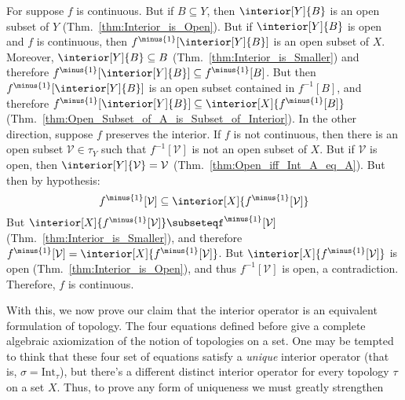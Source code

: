 \documentclass{article}                                                        %
\begin{document}
        \begin{bproof}
            For suppose $f$ is continuous. But if $B\subseteq{Y}$, then
            $\interior[Y]{B}$ is an open subset of $Y$
            (Thm.~\ref{thm:Interior_is_Open}). But if $\interior[Y]{B}$ is open
            and $f$ is continuous, then $f^{\minus{1}}[\interior[Y]{B}]$ is an
            open subset of $X$. Moreover, $\interior[Y]{B}\subseteq{B}$
            (Thm.~\ref{thm:Interior_is_Smaller}) and therefore
            $f^{\minus{1}}[\interior[Y]{B}]\subseteq{f}^{\minus{1}}[B]$. But
            then $f^{\minus{1}}[\interior[Y]{B}]$ is an open subset contained in
            $f^{\minus{1}}[B]$, and therefore
            $f^{\minus{1}}[\interior[Y]{B}]\subseteq%
             \interior[X]{f^{\minus{1}}[B]}$
            (Thm.~\ref{thm:Open_Subset_of_A_is_Subset_of_Interior}). In the
            other direction, suppose $f$ preserves the interior. If $f$ is not
            continuous, then there is an open subset $\mathcal{V}\in\tau_{Y}$
            such that $f^{\minus{1}}[\mathcal{V}]$ is not an open subset of $X$.
            But if $\mathcal{V}$ is open, then
            $\interior[Y]{\mathcal{V}}=\mathcal{V}$
            (Thm.~\ref{thm:Open_iff_Int_A_eq_A}). But then by hypothesis:
            \begin{equation}
                f^{\minus{1}}[\mathcal{V}]\subseteq
                \interior[X]{f^{\minus{1}}[\mathcal{V}]}
            \end{equation}
            But $\interior[X]{f^{\minus{1}}[\mathcal{V}]}\subseteq%
            f^{\minus{1}}[\mathcal{V}]$ (Thm.~\ref{thm:Interior_is_Smaller}),
            and therefore $f^{\minus{1}}[\mathcal{V}]=%
            \interior[X]{f^{\minus{1}}[\mathcal{V}]}$. But
            $\interior[X]{f^{\minus{1}}[\mathcal{V}]}$ is open
            (Thm.~\ref{thm:Interior_is_Open}), and thus
            $f^{\minus{1}}[\mathcal{V}]$ is open, a contradiction. Therefore,
            $f$ is continuous.
        \end{bproof}
        With this, we now prove our claim that the interior operator is an
        equivalent formulation of topology. The four equations defined before
        give a complete algebraic axiomization of the notion of topologies on a
        set. One may be tempted to think that these four set of equations
        satisfy a \textit{unique} interior operator (that is,
        $\sigma=\textrm{Int}_{\tau}$), but there's a different distinct
        interior operator for every topology $\tau$ on a set $X$. Thus, to prove
        any form of uniqueness we must greatly strengthen
\end{document}
